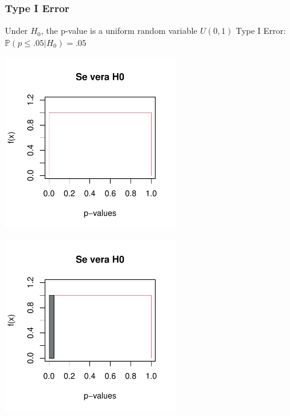 \documentclass[xcolor={dvipsnames}]{beamer}
\begin{document}
\begin{frame}
\frametitle{Type I Error}

\begin{overprint}
 {Under $H_0$, the p-value is a uniform random variable $U(0,1)$}
 {Type I Error: $\mathbb{P}(p\leq .05 |H_0)=.05$} %
\end{overprint} 
\begin{overprint} 
 \centerline{\includegraphics[width=7.5cm]{plaatjes/uniform1}}
 \centerline{\includegraphics[width=7.5cm]{plaatjes/uniform2}}
\end{overprint} 
\end{frame}
\end{document}
